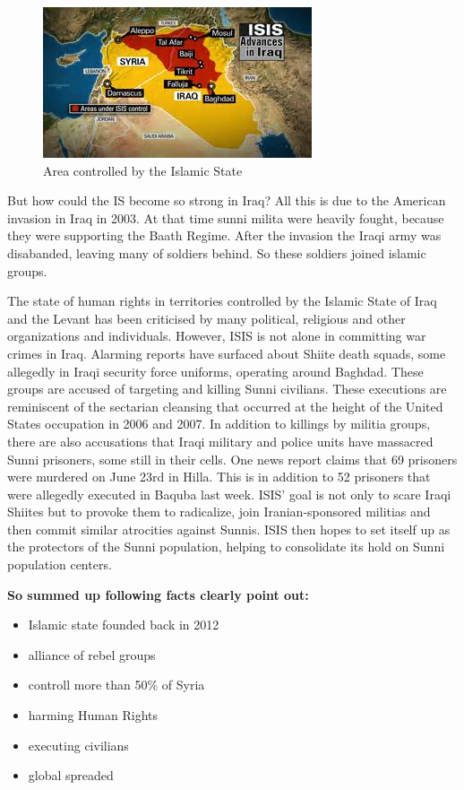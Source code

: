 \begin{figure}[!h]
	\begin{center}
		\includegraphics[width=0.5\linewidth]{images/ISIS_area}
		\caption{Area controlled by the Islamic State}
	\end{center}
\end{figure}

But how could the IS become so strong in Iraq? All this is due to the American invasion in Iraq in 2003. At that time sunni milita were heavily fought, because they were supporting the Baath Regime. After the invasion the Iraqi army was disabanded, leaving many of soldiers behind. So these soldiers joined islamic groups.

The state of human rights in territories controlled by the Islamic State of Iraq and the Levant has been criticised by many political, religious and other organizations and individuals. However, ISIS is not alone in committing war crimes in Iraq.  Alarming reports have surfaced about Shiite death squads, some allegedly in Iraqi security force uniforms, operating around Baghdad.  These groups are accused of targeting and killing Sunni civilians.  These executions are reminiscent of the sectarian cleansing that occurred at the height of the United States occupation in 2006 and 2007.  In addition to killings by militia groups, there are also accusations that Iraqi military and police units have massacred Sunni prisoners, some still in their cells.  One news report claims that 69 prisoners were murdered on June 23rd in Hilla.  This is in addition to 52 prisoners that were allegedly executed in Baquba last week.
ISIS’ goal is not only to scare Iraqi Shiites but to provoke them to radicalize, join Iranian-sponsored militias and then commit similar atrocities against Sunnis.  ISIS then hopes to set itself up as the protectors of the Sunni population, helping to consolidate its hold on Sunni population centers.


\textbf{So summed up following facts clearly point out:}
\begin{itemize}
	\item Islamic state founded back in 2012
	\item alliance of rebel groups
	\item controll more than 50\% of Syria
	\item harming Human Rights
	\item executing civilians
	\item global spreaded
\end{itemize}

